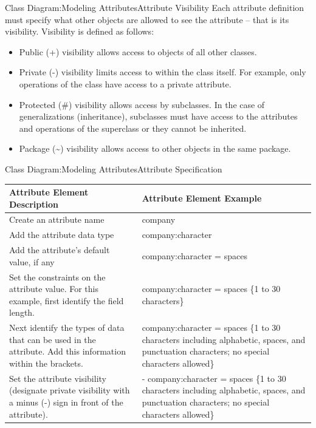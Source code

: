 \begin{frame}{Class Diagram:Modeling Attributes}{Attribute Visibility}
Each attribute definition must specify what other objects are allowed to see the attribute -- that is its visibility. 
Visibility is defined as follows:
    \begin{itemize}
         \item Public (+) visibility allows access to objects of all other classes.
         \item Private (-) visibility limits access to within the class itself. For example, only
operations of the class have access to a private attribute.
         \item Protected (\#) visibility allows access by subclasses. In the case of generalizations 
                   (inheritance), subclasses must have access to the attributes and operations of the superclass or 
                   they cannot be inherited.
         \item Package (\textasciitilde) visibility allows access to other objects in the same package.
   \end{itemize}
\end{frame}

\begin{frame}{Class Diagram:Modeling Attributes}{Attribute Specification}

      \begin{tabular}{p{4.5cm}p{6.5cm}}
        \toprule
        \textbf{Attribute Element Description} & \textbf{Attribute Element Example}  \\
        \midrule
	\scriptsize Create an attribute name & \scriptsize company\\
	\scriptsize Add the attribute data type & \scriptsize company:character \\
	\scriptsize Add the attribute’s default value, if any & \scriptsize company:character = spaces \\
	\scriptsize Set the constraints on the attribute value. For this example, first identify the field length. &  
          \scriptsize         company:character = spaces \{1 to 30 characters\} \\
	\scriptsize Next identify the types of data that can be used in the attribute. Add this information within the brackets. & 
        \scriptsize    company:character = spaces \{1 to 30 characters including alphabetic, spaces, and punctuation 
                characters; no special characters allowed\} \\
	\scriptsize Set the attribute visibility (designate private visibility with a minus (-) sign in front of the attribute). 
        &\scriptsize  - company:character = spaces \{1 to 30 characters including alphabetic, spaces, and punctuation characters; 
                 no special characters allowed\} \\

        \bottomrule

      \end{tabular}
\end{frame}

